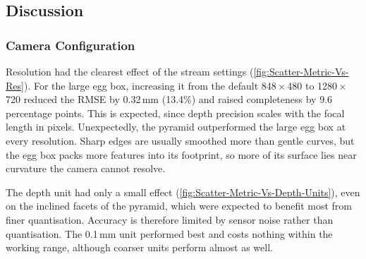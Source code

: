 %
%

\subsection{Discussion}

\subsubsection{Camera Configuration}
Resolution had the clearest effect of the stream settings (\autoref{fig:Scatter-Metric-Vs-Res}). For the large egg box, increasing it from the default 848\,$\times$\,480 to 1280\,$\times$\,720 reduced the RMSE by 0.32\,mm (13.4\%) and raised completeness by 9.6 percentage points. This is expected, since depth precision scales with the focal length in pixels. Unexpectedly, the pyramid outperformed the large egg box at every resolution. Sharp edges are usually smoothed more than gentle curves, but the egg box packs more features into its footprint, so more of its surface lies near curvature the camera cannot resolve.

The depth unit had only a small effect (\autoref{fig:Scatter-Metric-Vs-Depth-Units}), even on the inclined facets of the pyramid, which were expected to benefit most from finer quantisation. Accuracy is therefore limited by sensor noise rather than quantisation. The 0.1\,mm unit performed best and costs nothing within the working range, although coarser units perform almost as well.

